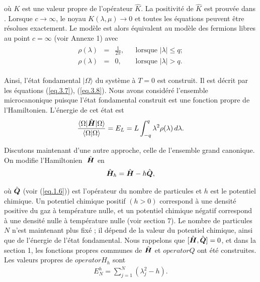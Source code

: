 où \( K \) est une valeur propre de l'opérateur \( \hat{K} \). La positivité de \( \hat{K} \) est prouvée dans \cite{14}. Lorsque \( c \to \infty \), le noyau \( K(\lambda, \mu) \to 0 \) et toutes les équations peuvent être résolues exactement. Le modèle est alors équivalent au modèle des fermions libres au point \( c = \infty \) (voir Annexe 1) avec
\begin{eqnarray}
	\left . \begin{array}{rclll} \rho(\lambda) & = & \displaystyle \frac{1}{2 \pi} , & & \mbox{lorsque } \vert \lambda \vert  \leq q ; \\ \rho(\lambda) & = & \displaystyle 0 , & & \mbox{lorsque } \vert \lambda \vert  > q. \end{array} \right . 
\end{eqnarray}

Ainsi, l'état fondamental \( \vert \Omega \rangle \) du système à \( T = 0 \) est construit. Il est décrit par les équations (\ref{eq.3.7}), (\ref{eq.3.8}). Nous avons considéré l'ensemble microcanonique puisque l'état fondamental construit est une fonction propre de l'Hamiltonien. L'énergie de cet état est
\begin{eqnarray}
	\frac{ \langle \Omega \vert \hat{\bm{H}} \vert  \Omega \rangle }{ \langle \Omega \vert \Omega \rangle } = E_L = L \int_{-q}^q \lambda^2 \rho ( \lambda ) \, d\lambda.	
\end{eqnarray}


Discutons maintenant d'une autre approche, celle de l'ensemble grand canonique. On modifie l'Hamiltonien \(  \operator{H}\) en
\begin{eqnarray}
	\hat{\bm{H}}_h = \hat{\bm{H}} - h\hat{\bm{Q}}, 	
\end{eqnarray}

où \(\hat{\bm{Q}} \) (voir (\ref{eq.1.6})) est l'opérateur du nombre de particules et \( h \) est le potentiel chimique. Un potentiel chimique positif \( (h > 0) \) correspond à une densité positive du gaz à température nulle, et un potentiel chimique négatif correspond à une densité nulle à température nulle (voir section 7). Le nombre de particules \( N \) n'est maintenant plus fixé ; il dépend de la valeur du potentiel chimique, ainsi que de l'énergie de l'état fondamental. Nous rappelons que \( [\hat{\bm{H}}, \hat{\bm{Q}}] = 0 \), et dans la section 1, les fonctions propres communes de \( \operator{H} \) et \( operator{Q }\) ont été construites. Les valeurs propres de \( operator{H}_h \) sont
\begin{eqnarray}
	E_N^h = \sum_{j=1}^{N} \left( \lambda_j^2 - h \right).	
\end{eqnarray}

